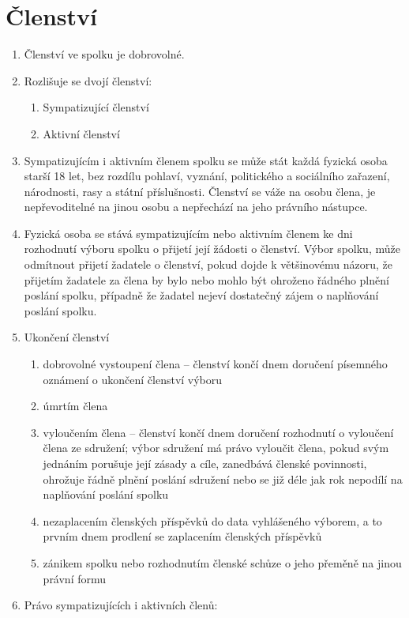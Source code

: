 \documentclass[11pt]{article}
\begin{document}
\section{Členství}
\begin{enumerate}
\item Členství ve spolku je dobrovolné.
\item Rozlišuje se dvojí členství:
\begin{enumerate}
\item Sympatizující členství
\item Aktivní členství
\end{enumerate}
\item Sympatizujícím i aktivním členem spolku se může stát každá fyzická osoba starší 18 let, bez rozdílu pohlaví, vyznání, politického a sociálního zařazení, národnosti, rasy a státní příslušnosti. Členství se váže na osobu člena, je nepřevoditelné na jinou osobu a nepřechází na jeho právního nástupce. 
\item Fyzická osoba se stává sympatizujícím nebo aktivním členem ke dni rozhodnutí výboru spolku o přijetí její žádosti o členství. Výbor spolku, může odmítnout přijetí žadatele o členství, pokud dojde k většinovému názoru, že přijetím žadatele za člena by bylo nebo mohlo být ohroženo řádného plnění poslání spolku, případně že žadatel nejeví dostatečný zájem o naplňování poslání spolku.
\item Ukončení členství
\begin{enumerate}
\item dobrovolné vystoupení člena – členství končí dnem doručení písemného oznámení o ukončení členství výboru
\item úmrtím člena 
\item vyloučením člena – členství končí dnem doručení rozhodnutí o vyloučení člena ze sdružení; výbor sdružení má právo vyloučit člena, pokud svým jednáním porušuje její zásady a cíle, zanedbává členské povinnosti, ohrožuje řádně plnění poslání sdružení nebo se již déle jak rok nepodílí na naplňování poslání spolku
\item nezaplacením členských příspěvků do data vyhlášeného výborem, a to prvním dnem prodlení se zaplacením členských příspěvků
\item zánikem spolku nebo rozhodnutím členské schůze o jeho přeměně na jinou právní formu
\end{enumerate}
\item Právo sympatizujících i aktivních členů:
\begin{enumerate}

\end{enumerate}
\end{enumerate}
\end{document}
